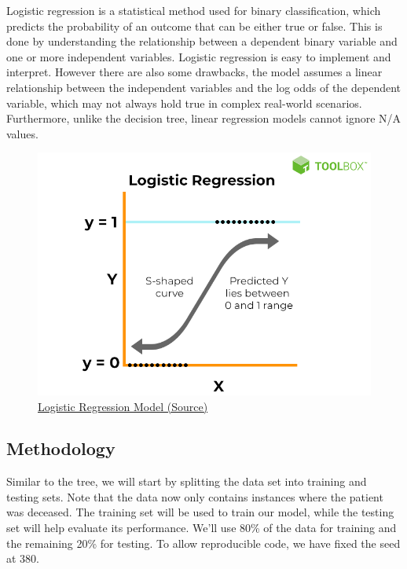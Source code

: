 \documentclass[
]{article}
\begin{document}
Logistic regression is a statistical method used for binary
classification, which predicts the probability of an outcome that can be
either true or false. This is done by understanding the relationship
between a dependent binary variable and one or more independent
variables. Logistic regression is easy to implement and interpret.
However there are also some drawbacks, the model assumes a linear
relationship between the independent variables and the log odds of the
dependent variable, which may not always hold true in complex real-world
scenarios. Furthermore, unlike the decision tree, linear regression
models cannot ignore N/A values.

\begin{figure}
\centering
\includegraphics{46-4.png}
\caption{\ul{Logistic Regression Model
(\href{https://www.spiceworks.com/tech/artificial-intelligence/articles/what-is-logistic-regression/}{Source})}}
\end{figure}

\hypertarget{methodology-1}{%
\subsection{Methodology}\label{methodology-1}}

Similar to the tree, we will start by splitting the data set into
training and testing sets. Note that the data now only contains
instances where the patient was deceased. The training set will be used
to train our model, while the testing set will help evaluate its
performance. We'll use 80\% of the data for training and the remaining
20\% for testing. To allow reproducible code, we have fixed the seed at
380.
\end{document}
